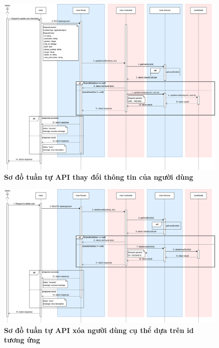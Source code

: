 \begin{figure}[H]
	\centering
	\includegraphics[width=16cm]{Images/api_sequence/user/updateUserById.drawio.png}
	\caption[Sơ đồ tuần tự API chỉnh sửa thông tin của người dùng]{\bfseries \fontsize{12pt}{0pt}\selectfont Sơ đồ tuần tự API thay đổi thông tin của người dùng}
	\label{sequence_diagram_update_user}
\end{figure}

\begin{figure}[H]
	\centering
	\includegraphics[width=16cm]{Images/api_sequence/user/deleteUserById.drawio.png}
	\caption[Sơ đồ tuần tự API xóa người dùng cụ thể dựa trên id tương ứng]{\bfseries \fontsize{12pt}{0pt}\selectfont Sơ đồ tuần tự API xóa người dùng cụ thể dựa trên id tương ứng}
	\label{sequence_diagram_delete_user}
\end{figure}

